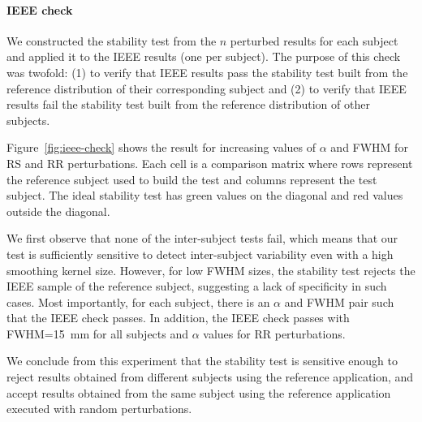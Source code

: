 \documentclass[lettersize,journal]{IEEEtran}
\begin{document}
\paragraph{IEEE check} We constructed the stability test from the $n$ perturbed results for each subject and applied it to the IEEE results (one per subject). The purpose of this check was twofold: (1) to verify that IEEE results pass the stability test built from the reference distribution of their corresponding subject and (2) to verify that IEEE results fail the stability test built from the reference distribution of other subjects.

Figure~\ref{fig:ieee-check} shows the result for increasing values of $\alpha$ and FWHM for RS and RR perturbations. Each cell is a comparison matrix where rows represent the reference subject used to build the test and columns represent the test subject. The ideal stability test has green values on the diagonal and red values outside the diagonal.

We first observe that none of the inter-subject tests fail, which means that our test is sufficiently sensitive to detect inter-subject variability even with a high smoothing kernel size. However, for low FWHM sizes, the stability test rejects the IEEE sample of the reference subject, suggesting a lack of specificity in such cases. Most importantly, for each subject, there is an $\alpha$ and FWHM pair such that the IEEE check passes. In addition, the IEEE check passes with FWHM=15~mm for all subjects and $\alpha$ values for RR perturbations.

We conclude from this experiment that the stability test is sensitive enough to reject results obtained from different subjects using the reference application, and accept results obtained from the same subject using
the reference application executed with random perturbations.
\end{document}
